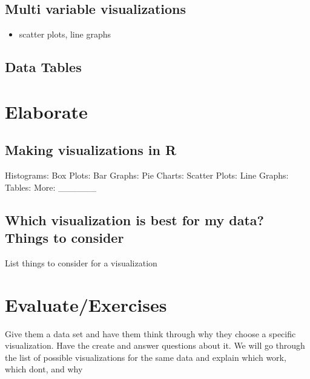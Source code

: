 \documentclass[
]{book}
\providecommand{\tightlist}{%
  \setlength{\itemsep}{0pt}\setlength{\parskip}{0pt}}
\begin{document}
\hypertarget{multi-variable-visualizations}{%
\subsection{Multi variable visualizations}\label{multi-variable-visualizations}}

\begin{itemize}
\tightlist
\item
  scatter plots, line graphs
\end{itemize}

\hypertarget{data-tables}{%
\subsection{Data Tables}\label{data-tables}}

\hypertarget{elaborate-1}{%
\section{Elaborate}\label{elaborate-1}}

\hypertarget{making-visualizations-in-r}{%
\subsection{Making visualizations in R}\label{making-visualizations-in-r}}

Histograms:
Box Plots:
Bar Graphs:
Pie Charts:
Scatter Plots:
Line Graphs:
Tables:
More: \_\_\_\_\_\_

\hypertarget{which-visualization-is-best-for-my-data-things-to-consider}{%
\subsection{Which visualization is best for my data? Things to consider}\label{which-visualization-is-best-for-my-data-things-to-consider}}

List things to consider for a visualization

\hypertarget{evaluateexercises-1}{%
\section{Evaluate/Exercises}\label{evaluateexercises-1}}

Give them a data set and have them think through why they choose a specific visualization. Have the create and answer questions about it.
We will go through the list of possible visualizations for the same data and explain which work, which dont, and why
\end{document}

